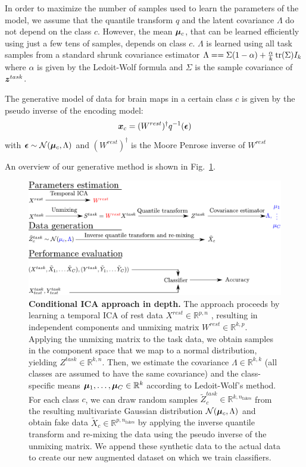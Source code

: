 In order to maximize the number of samples used to learn the parameters of the
model, we assume that the quantile transform $q$ and the latent covariance
$\Lambda$ do not depend on the class $c$. However, the mean $\boldsymbol{\mu}_c$, that can be learned efficiently using just a few tens of samples, depends on class $c$.
$\Lambda$ is learned using all task samples from a standard shrunk covariance
estimator
$\Lambda = = \Sigma (1 - \alpha) + \frac{\alpha}{k} \mathop{\mathrm{tr}}(\Sigma) I_k$ where
$\alpha$ is given by the Ledoit-Wolf formula \cite{ledoit2004well} and
$\Sigma$ is the sample covariance of $\boldsymbol{z}^{task}$.

The generative model of data for brain maps in a certain class $c$ is given by the pseudo inverse of the encoding model:
\begin{equation}
  \boldsymbol{x}_c = (W^{rest})^{\dagger} q^{-1}(\boldsymbol{\epsilon})
\end{equation}
with $\boldsymbol{\epsilon} \sim \mathcal{N}(\boldsymbol{\mu}_c, \Lambda)$ and $(W^{rest})^{\dagger}$ is
the Moore Penrose inverse of $W^{rest}$

An overview of our generative method is shown in Fig.~\ref{Fig11}.
%
\begin{figure}
\centerline{\includegraphics[width=1\textwidth]{figures/condica/method_figure}}
\caption{\textbf{Conditional ICA approach in depth.} 
The approach proceeds by learning a temporal ICA of rest data $X^{rest} \in
\mathbb{R}^{p, n}$ , resulting in
independent components and unmixing matrix $W^{rest} \in \mathbb{R}^{k, p}$.
%
Applying the unmixing matrix to the task data, we obtain samples in the component
space that we map to a normal distribution, yielding $Z^{task} \in
\mathbb{R}^{k, n}$. 
%
Then, we estimate the covariance $\Lambda \in \mathbb{R}^{k, k}$ (all classes are assumed to have the
same covariance) and the class-specific means $\boldsymbol{\mu}_1, \dots, \boldsymbol{\mu}_C \in \mathbb{R}^{k}$ according to Ledoit-Wolf's method.
%
For each class $c$, we can draw random samples $\tilde{Z}^{task}_c \in
\mathbb{R}^{k, n_{\mathrm{fakes}}}$ from the
resulting multivariate Gaussian distribution $\mathcal{N}(\boldsymbol{\mu}_c, \Lambda)$ and
obtain fake data $\tilde{X}_c  \in
\mathbb{R}^{p, n_{\mathrm{fakes}}}$
by applying the inverse quantile transform and re-mixing the data using the pseudo inverse of the unmixing matrix.
%
We append these synthetic data to the actual data to create our new augmented
dataset on which we train classifiers.}
\label{Fig11}
\end{figure}
%

